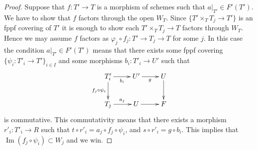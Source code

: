 \documentclass[10pt,a4paper]{amsart}
\theoremstyle{plain}
\theoremstyle{definition}
\theoremstyle{remark}
\numberwithin{equation}{subsection}
\def\Im{\mathop{\mathrm{Im}}}
\begin{document}
\begin{proof}
\medskip\noindent
Suppose that $f : T' \to T$ is a morphism of schemes
such that $a|_{T'} \in F'(T')$. We have to show that
$f$ factors through the open $W_T$. Since
$\{T' \times_T T_j \to T'\}$ is an fppf covering of $T'$
it is enough to show each $T' \times_T T_j \to T$
factors through $W_T$. Hence we may assume $f$ factors
as $\varphi_j \circ f_j : T' \to T_j \to T$ for some $j$.
In this case the condition $a|_{T'} \in F'(T')$ means that there exists
some fppf covering $\{\psi_i : T'_i \to T'\}_{i \in I}$ and some
morphisms $b_i : T'_i \to U'$ such that
$$
\xymatrix{
T'_i \ar[r]_{b_i} \ar[d]_{f_j \circ \psi_i} & U' \ar[r]_g & U \ar[d] \\
T_j \ar[r]^{a_j} & U \ar[r] & F
}
$$
is commutative. This commutativity means that there exists a
morphism $r'_i : T'_i \to R$ such that
$t \circ r'_i = a_j \circ f_j \circ \psi_i$, and
$s \circ r'_i = g \circ b_i$. This implies that
$\Im(f_j \circ \psi_i) \subset W_j$ and we win.
\end{proof}
\end{document}
